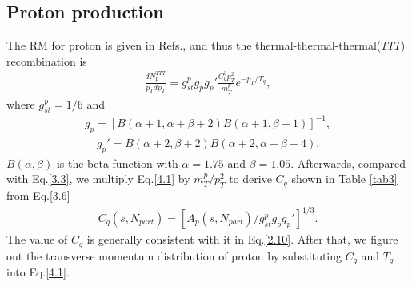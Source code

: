 \documentclass[twocolumn,aps,superscriptaddress,showpacs,nofootinbib,floatfix]{revtex4}
\begin{document}
\subsection{Proton production}
The RM for proton is given in Refs.\cite{2u,Zhu:2013cza,Hwa:2002tu,Hwa:2004ng,Hwa:2011bw}, and thus the thermal-thermal-thermal($TTT$) recombination is 
\begin{eqnarray}
\frac{dN_p^{TTT}}{p_Tdp_T}=g_{st}^pg_pg_p'\frac{C_q^3p_T^2}{m_T^p}e^{-p_T/T_q}, \label{4.1}
\end{eqnarray}
where $g_{st}^p=1/6$ and
\begin{eqnarray}
g_p=[B(\alpha+1, \alpha+\beta+2)B(\alpha+1, \beta+1)]^{-1}, \label{4.2}
\end{eqnarray}
\begin{eqnarray}
g_p'=B(\alpha+2, \beta+2)B(\alpha+2, \alpha+\beta+4). \label{4.3}
\end{eqnarray}
$B(\alpha, \beta)$ is the beta function with $\alpha=1.75$ and $\beta=1.05$.
Afterwards, compared with Eq.\ref{3.3}, we multiply Eq.\ref{4.1} by $m_T^p/p_T^2$ to derive $C_q$ shown in Table \ref{tab3} from Eq.\ref{3.6}
\begin{eqnarray}
	C_q(s,N_{part})=[A_{p}(s,N_{part})/g_{st}^p g_p g_p']^{1/3} .\label{4.4}
\end{eqnarray}
The value of $C_q$ is generally consistent with it in Eq.\ref{2.10}. After that, we figure out the transverse momentum distribution of proton by substituting $C_q$ and $T_q$ into Eq.\ref{4.1}.
\end{document}
